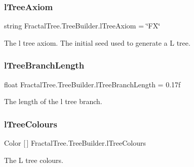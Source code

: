 \subsubsection{\texorpdfstring{l\+Tree\+Axiom}{lTreeAxiom}}
{\footnotesize\ttfamily string Fractal\+Tree.\+Tree\+Builder.\+l\+Tree\+Axiom = \char`\"{}FX\char`\"{}}



The l tree axiom. The initial seed used to generate a L tree. 

\hypertarget{class_fractal_tree_1_1_tree_builder_a7416e2e2bea136c1406f79a98a8026ee}{}\label{class_fractal_tree_1_1_tree_builder_a7416e2e2bea136c1406f79a98a8026ee} 
\subsubsection{\texorpdfstring{l\+Tree\+Branch\+Length}{lTreeBranchLength}}
{\footnotesize\ttfamily float Fractal\+Tree.\+Tree\+Builder.\+l\+Tree\+Branch\+Length = 0.\+17f}



The length of the l tree branch. 

\hypertarget{class_fractal_tree_1_1_tree_builder_adf9df8010eaa8ed629b6e5210474b7eb}{}\label{class_fractal_tree_1_1_tree_builder_adf9df8010eaa8ed629b6e5210474b7eb} 
\subsubsection{\texorpdfstring{l\+Tree\+Colours}{lTreeColours}}
{\footnotesize\ttfamily Color \mbox{[}$\,$\mbox{]} Fractal\+Tree.\+Tree\+Builder.\+l\+Tree\+Colours}



The L tree colours. 

\hypertarget{class_fractal_tree_1_1_tree_builder_af50b64e86abfc4709fdfc6368ff7504b}{}\label{class_fractal_tree_1_1_tree_builder_af50b64e86abfc4709fdfc6368ff7504b} 
